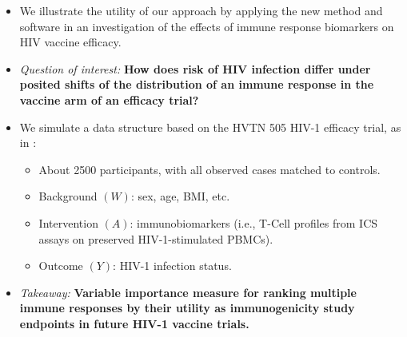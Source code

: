\documentclass[landscape,a0paper,fontscale=0.285]{baposter} %
\newcommand{\compresslist}{ %
\setlength{\itemsep}{1pt}
\setlength{\parskip}{0pt}
\setlength{\parsep}{0pt}
}
\begin{document}
\begin{poster}
{\begin{itemize}\compresslist
\setlength\itemsep{0.5em}
\item We illustrate the utility of our approach by applying the new method and
  software in an investigation of the effects of immune response biomarkers on
  HIV vaccine efficacy.
\item \textit{Question of interest:} \textbf{How does risk of HIV infection
   differ under posited shifts of the distribution of an immune response in the
   vaccine arm of an efficacy trial?}
\item We simulate a data structure based on the HVTN 505 HIV-1 efficacy trial,
  as in \cite{janes2017higher}:
  \begin{itemize}
    \itemsep0.5pt
    \item About 2500 participants, with all observed cases matched to controls.
    \item Background $(W)$: sex, age, BMI, etc.
    \item Intervention $(A)$: immunobiomarkers (i.e., T-Cell profiles from ICS
      assays on preserved HIV-1-stimulated PBMCs).
    \item Outcome $(Y)$: HIV-1 infection status.
  \end{itemize}
\item \textit{Takeaway:} \textbf{Variable importance measure for ranking
   multiple immune responses by their utility as immunogenicity study endpoints
   in future HIV-1 vaccine trials.}
\end{itemize}
}




\end{poster}
\end{document}
